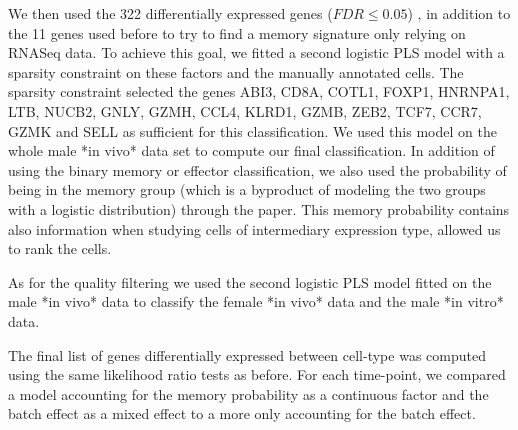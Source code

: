 \documentclass[a4paper,12pt]{article}
\begin{document}
We then used the 322 differentially expressed genes ($FDR \leq 0.05$) \cite{benjaminiControllingFalseDiscovery1995}, in addition to the 11 genes used before to try to find a memory signature only relying on RNASeq data.
To achieve this goal, we fitted a second logistic PLS model with a sparsity constraint on these factors and the manually annotated cells.
The sparsity constraint selected the genes ABI3, CD8A, COTL1, FOXP1, HNRNPA1, LTB, NUCB2, GNLY, GZMH, CCL4, KLRD1, GZMB, ZEB2, TCF7, CCR7, GZMK and SELL as sufficient for this classification.
We used this model on the whole male *in vivo* data set to compute our final classification.
In addition of using the binary memory or effector classification, we also used the probability of being in the memory group (which is a byproduct of modeling the two groups with a logistic distribution) through the paper.
This memory probability contains also information when studying cells of intermediary expression type, allowed us to rank the cells.

As for the quality filtering we used the second logistic PLS model fitted on the male *in vivo* data to classify the female *in vivo* data and the male *in vitro* data.

The final list of genes differentially expressed between cell-type was computed using the same likelihood ratio tests as before.
For each time-point, we compared a model accounting for the memory probability as a continuous factor and the batch effect as a mixed effect to a more only accounting for the batch effect.



\end{document}

